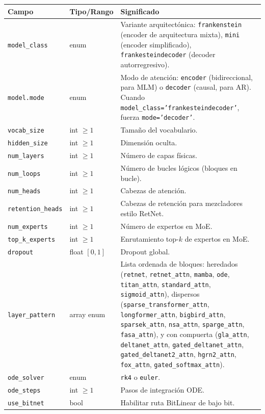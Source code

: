 \small
\begin{longtable}{p{5.1cm}p{2.4cm}p{7.0cm}}
\toprule
\textbf{Campo} & \textbf{Tipo/Rango} & \textbf{Significado} \\
\midrule
\endhead
\texttt{model\_class} & enum & Variante arquitectónica: \texttt{frankenstein} (encoder de arquitectura mixta), \texttt{mini} (encoder simplificado), \texttt{frankesteindecoder} (decoder autorregresivo). \\
\texttt{model.mode} & enum & Modo de atención: \texttt{encoder} (bidireccional, para MLM) o \texttt{decoder} (causal, para AR). Cuando \texttt{model\_class='frankesteindecoder'}, fuerza \texttt{mode='decoder'}. \\
\texttt{vocab\_size} & int $\ge 1$ & Tamaño del vocabulario. \\
\texttt{hidden\_size} & int $\ge 1$ & Dimensión oculta. \\
\texttt{num\_layers} & int $\ge 1$ & Número de capas físicas. \\
\texttt{num\_loops} & int $\ge 1$ & Número de bucles lógicos (bloques en bucle). \\
\texttt{num\_heads} & int $\ge 1$ & Cabezas de atención. \\
\texttt{retention\_heads} & int $\ge 1$ & Cabezas de retención para mezcladores estilo RetNet. \\
\texttt{num\_experts} & int $\ge 1$ & Número de expertos en MoE. \\
\texttt{top\_k\_experts} & int $\ge 1$ & Enrutamiento top-$k$ de expertos en MoE. \\
\texttt{dropout} & float $[0,1]$ & Dropout global. \\
\texttt{layer\_pattern} & array enum & Lista ordenada de bloques: heredados (\texttt{retnet}, \texttt{retnet\_attn}, \texttt{mamba}, \texttt{ode}, \texttt{titan\_attn}, \texttt{standard\_attn}, \texttt{sigmoid\_attn}), dispersos (\texttt{sparse\_transformer\_attn}, \texttt{longformer\_attn}, \texttt{bigbird\_attn}, \texttt{sparsek\_attn}, \texttt{nsa\_attn}, \texttt{sparge\_attn}, \texttt{fasa\_attn}), y con compuerta (\texttt{gla\_attn}, \texttt{deltanet\_attn}, \texttt{gated\_deltanet\_attn}, \texttt{gated\_deltanet2\_attn}, \texttt{hgrn2\_attn}, \texttt{fox\_attn}, \texttt{gated\_softmax\_attn}). \\
\texttt{ode\_solver} & enum & \texttt{rk4} o \texttt{euler}. \\
\texttt{ode\_steps} & int $\ge 1$ & Pasos de integración ODE. \\
\texttt{use\_bitnet} & bool & Habilitar ruta BitLinear de bajo bit. \\

\end{longtable}
